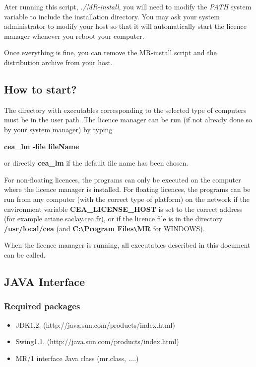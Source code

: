 Ater running this script, \textsl{./MR-install}, you
will need to modify the \textsl{PATH} system variable to include
the installation directory. You may ask your system administrator to modify
your host so that it will automatically start the licence manager 
whenever you reboot your computer.

Once everything is fine, you can remove the MR-install script and 
the distribution archive from your host.


\subsection{How to start?}

The directory with executables corresponding to the selected
type of computers must be in the user path.  
The licence manager can be run (if not already done so by your system manager)
by typing 
\begin{center}
 {\bf cea\_lm -file fileName}
 \end{center}
 or directly {\bf cea\_lm} if the default file name has been chosen. 

For non-floating licences, the programs
can only be executed on the computer where the  licence manager is installed.
For floating licences, the programs can be run from any computer (with the 
correct type of platform) on the network 
if the environment variable {\bf CEA\_LICENSE\_HOST} is set 
to the correct address (for example ariane.saclay.cea.fr), or if the licence file is 
in the directory {\bf /usr/local/cea} (and {\bf  C:\verb+\+Program Files\verb+\+MR} for WINDOWS).

When the licence manager is running, all executables described in 
this document can be called.

\subsection{JAVA Interface}
 
\subsubsection*{Required packages}
\begin{itemize}
\item JDK1.2. (http://java.sun.com/products/index.html)
\item Swing1.1. (http://java.sun.com/products/index.html)
\item MR/1 interface Java class (mr.class, ....)
\end{itemize} 

